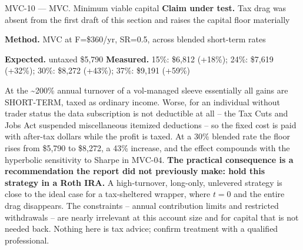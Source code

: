 \begin{caveat}{MVC-10 \; --- \; MVC. Minimum viable capital}
\textbf{Claim under test.} Tax drag was absent from the first draft of this section and raises the capital floor materially

\textbf{Method.} MVC at F=\$360/yr, SR=0.5, across blended short-term rates

\textbf{Expected.} untaxed \$5,790 \quad \textbf{Measured.} 15\%: \$6,812 (+18\%); 24\%: \$7,619 (+32\%); 30\%: \$8,272 (+43\%); 37\%: \$9,191 (+59\%)

At the \textasciitilde{}200\% annual turnover of a vol-managed sleeve essentially all gains are SHORT-TERM, taxed as ordinary income. Worse, for an individual without trader status the data subscription is not deductible at all -- the Tax Cuts and Jobs Act suspended miscellaneous itemized deductions -- so the fixed cost is paid with after-tax dollars while the profit is taxed. At a 30\% blended rate the floor rises from \$5,790 to \$8,272, a 43\% increase, and the effect compounds with the hyperbolic sensitivity to Sharpe in MVC-04. \textbf{The practical consequence is a recommendation the report did not previously make: hold this strategy in a Roth IRA.} A high-turnover, long-only, unlevered strategy is close to the ideal case for a tax-sheltered wrapper, where $t=0$ and the entire drag disappears. The constraints -- annual contribution limits and restricted withdrawals -- are nearly irrelevant at this account size and for capital that is not needed back. Nothing here is tax advice; confirm treatment with a qualified professional.
\end{caveat}
